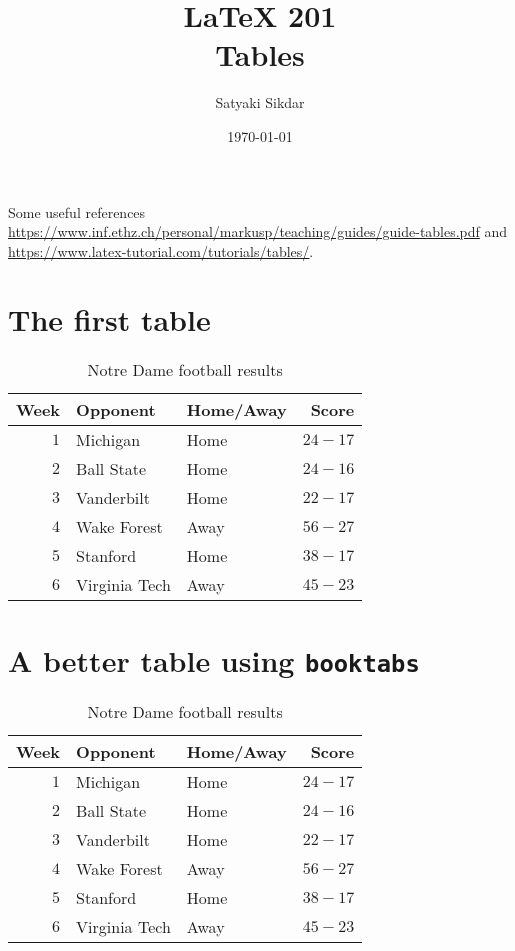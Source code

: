 \documentclass{article}
\title{\LaTeX{} 201 \\ Tables}
\author{Satyaki Sikdar}
\date{\today}
\begin{document}
\maketitle

Some useful references \url{https://www.inf.ethz.ch/personal/markusp/teaching/guides/guide-tables.pdf} and \url{https://www.latex-tutorial.com/tutorials/tables/}.

\section{The first table}

\begin{table}[htb]
    \centering
    \caption{Notre Dame football results}
    \vspace{0.1in}
    \label{tab:table2}
    \begin{tabular}{|r|l|l|r|}
        \hline 
        Week & Opponent & Home/Away & Score \\ 
        \hline 
        $1$ & Michigan & Home & $24-17$ \\ \hline
        $2$ & Ball State & Home & $24-16$ \\ \hline 
        $3$ & Vanderbilt & Home & $22-17$ \\ \hline
        $4$ & Wake Forest & Away & $56-27$ \\ \hline 
        $5$ & Stanford & Home & $38-17$ \\ \hline 
        $6$ & Virginia Tech & Away & $45-23$ \\ \hline 
    \end{tabular}
\end{table}

\newpage

\section{A better table using {\tt booktabs}}

\begin{table}[htb]
    \centering
    \caption{Notre Dame football results}
    \vspace{0.1in}
    \label{tab:table1}
    \begin{tabular}{rllr}
        \toprule
        Week & Opponent & Home/Away & Score \\ 
        \midrule  
        $1$ & Michigan & Home & $24-17$ \\ 
        $2$ & Ball State & Home & $24-16$ \\
        $3$ & Vanderbilt & Home & $22-17$ \\
        $4$ & Wake Forest & Away & $56-27$ \\
        $5$ & Stanford & Home & $38-17$ \\ 
        $6$ & Virginia Tech & Away & $45-23$ \\
        \bottomrule
    \end{tabular}
\end{table}
\end{document}
